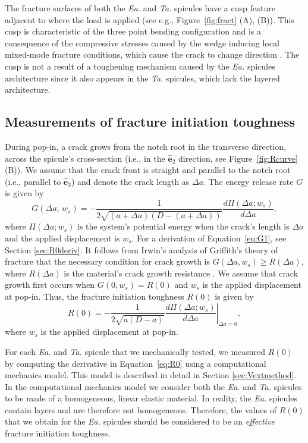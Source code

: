 \documentclass[12pt,onecolumn]{article}
\makeatletter
\newcommand{\ey}{{\bm{\hat{e}}}_2}
\newcommand{\ez}{{\bm{\hat{e}}}_3}
\newcommand{\TA}{\textit{Ta.\@}\xspace}
\newcommand{\EA}{\textit{Ea.\@}\xspace}
\makeatother
\begin{document}
\begin{bibunit}
The fracture surfaces of both the \EA and \TA spicules have a cusp feature adjacent to where the load is applied (see e.g., Figure~\ref{fig:fract} (A), (B)). This cusp is characteristic of the three point bending configuration \cite{quinn2007fractography} and is a consequence of the compressive stresses caused by the wedge inducing local mixed-mode fracture conditions, which cause the crack to change direction \cite{anderson2017fracture}. The cusp is not a result of a toughening mechanism caused by the \EA spicules architecture since it also appears in the \TA spicules, which lack the layered architecture.


\subsection{Measurements of fracture initiation toughness}
\label{sec:Gc}
During pop-in, a crack grows from the notch root in the transverse direction, across the spicule's cross-section (i.e., in the $\ey$ direction, see Figure~\ref{fig:Rcurve} (B)). We assume that the crack front is straight and parallel to the notch root (i.e., parallel to $\ez$) and denote the crack length as $\Delta a$. The energy release rate $G$ is given by
%
\begin{equation}
    \label{eq:G1}
    G(\Delta a;\,w_s)=-\frac{1}{2\sqrt{(a+\Delta a)(D-(a+\Delta a))}}\frac{d\Pi(\Delta a; w_s)}{d\Delta a },
\end{equation}
%
where $\Pi(\Delta a;w_s)$ is the system's potential energy when the crack's length is $\Delta a$ and the applied displacement is $w_s$. For a derivation of Equation~\eqref{eq:G1}, see Section \ref{sec:R0deriv}. It follows from Irwin's analysis of Griffith's theory of fracture that the necessary condition for crack growth is $G(\Delta a,w_s)\geq R(\Delta a)$, where $R(\Delta a)$ is the material's crack growth resistance \cite{anderson2017fracture}. We assume that crack growth first occurs when $G(0,w_s)=R(0)$ and $w_s$ is the applied displacement at pop-in. Thus, the fracture initiation toughness $R(0)$ is given by
%
\begin{equation}
    \label{eq:R0}
    R(0)=-\frac{1}{2\sqrt{a(D-a)}} \left.\frac{d\Pi(\Delta a; w_s)}{d\Delta a }\right\vert_{\Delta a=0},
\end{equation}
%
where $w_s$ is the applied displacement at pop-in.

For each \EA and \TA spicule that we mechanically tested, we measured $R(0)$ by computing the derivative in Equation~\eqref{eq:R0} using a computational mechanics model. This model is described in detail in Section \ref{sec:Vextmethod}. In the computational mechanics model we consider both the \EA and \TA spicules to be made of a homogeneous, linear elastic material. In reality, the \EA spicules contain layers and are therefore not homogeneous. Therefore, the values of $R(0)$ that we obtain for the \EA spicules should be considered to be an \emph{effective} fracture initiation toughness.


\end{bibunit}
\end{document}
